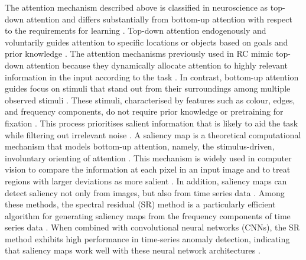 \documentclass[pdflatex,sn-nature]{sn-jnl}
\theoremstyle{thmstyleone}%
\theoremstyle{thmstyletwo}%
\theoremstyle{thmstylethree}%
\begin{document}
The attention mechanism described above is classified in neuroscience as top-down attention and differs substantially from bottom-up attention with respect to the requirements for learning \cite{chica2013two,meyer2018exogenous,carrasco2011visual,katsuki2014bottom}. 
Top-down attention endogenously and voluntarily guides attention to specific locations or objects based on goals and prior knowledge \cite{chica2013two,thiele2018neuromodulation}.
The attention mechanisms previously used in RC mimic top-down attention because they dynamically allocate attention to highly relevant information in the input according to the task \cite{niu2021review}.
In contrast, bottom-up attention guides focus on  stimuli that stand out from their surroundings among multiple observed stimuli \cite{chica2013two,duncan1989visual,carrasco2011visual,katsuki2014bottom,nothdurft1993role,treisman1980feature}.
These stimuli, characterised by features such as colour, edges, and frequency components, do not require prior knowledge or pretraining for fixation \cite{knierim1992neuronal,schein1990spectral,tanaka1986analysis}. 
This process prioritises salient information that is likely to aid the task while filtering out irrelevant noise \cite{pratte2013attention,sperling1960information,Cowan2023TheRB}.
A saliency map is a theoretical computational mechanism that models bottom-up attention, namely, the stimulus-driven, involuntary orienting of attention \cite{itti2000saliency,itti1998model,hou2007saliency}.
This mechanism is widely used in computer vision to compare the information at each pixel in an input image and to treat regions with larger deviations as more salient \cite{borji2019salient}.
In addition, saliency maps can detect saliency not only from images, but also from time series data \cite{ren2019time,Pan2020Series}.
Among these methods, the spectral residual (SR) method is a particularly efficient algorithm for generating saliency maps from the frequency components of time series data \cite{hou2007saliency,ren2019time}. 
When combined with convolutional neural networks (CNNs), the SR method exhibits high performance in time-series anomaly detection, indicating that saliency maps work well with these neural network architectures \cite{ren2019time}.
\end{document}
